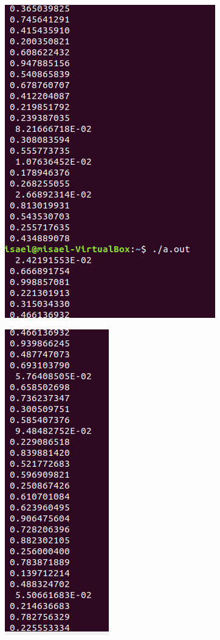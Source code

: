 \documentclass[12pt,a4paper]{article}
\begin{document}
\begin{enumerate}
    \begin{figure}[h!]
        \centering
        \includegraphics[scale=0.6]{3.4.PNG}
    \end{figure}
    
    \begin{figure}[h!]
        \centering
        \includegraphics[scale=0.6]{3.5.PNG}
    \end{figure}
    

\end{enumerate}
\end{document}
